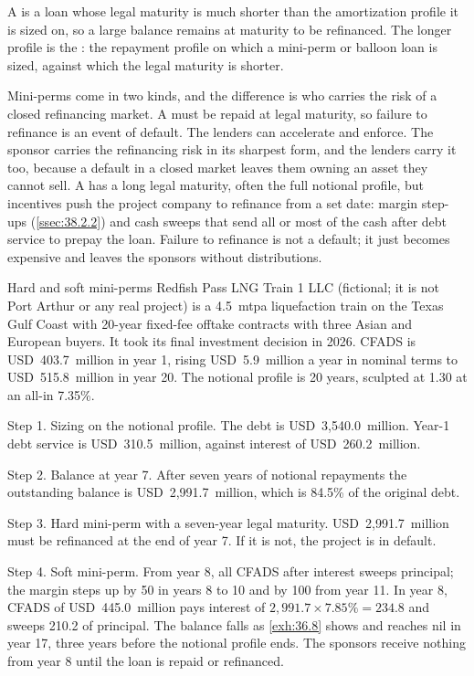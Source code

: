 A  is a loan whose legal maturity is much shorter than the amortization profile it is sized on, so a large balance remains at maturity to be refinanced. The longer profile is the : the repayment profile on which a mini-perm or balloon loan is sized, against which the legal maturity is shorter.

Mini-perms come in two kinds, and the difference is who carries the risk of a closed refinancing market. A  must be repaid at legal maturity, so failure to refinance is an event of default. The lenders can accelerate and enforce. The sponsor carries the refinancing risk in its sharpest form, and the lenders carry it too, because a default in a closed market leaves them owning an asset they cannot sell. A  has a long legal maturity, often the full notional profile, but incentives push the project company to refinance from a set date: margin step-ups (\cref{ssec:38.2.2}) and cash sweeps that send all or most of the cash after debt service to prepay the loan. Failure to refinance is not a default; it just becomes expensive and leaves the sponsors without distributions.

\begin{example}{Hard and soft mini-perms \illustrative}\label{ex:36.10}
Redfish Pass LNG Train 1 LLC (fictional; it is not Port Arthur or any real project) is a 4.5~mtpa liquefaction train on the Texas Gulf Coast with 20-year fixed-fee offtake contracts with three Asian and European buyers. It took its final investment decision in 2026. CFADS is USD~403.7~million in year 1, rising USD~5.9~million a year in nominal terms to USD~515.8~million in year 20. The notional profile is 20 years, sculpted at 1.30\x{} at an all-in 7.35\%.

Step 1. Sizing on the notional profile. The debt is USD~3,540.0~million. Year-1 debt service is USD~310.5~million, against interest of USD~260.2~million.

Step 2. Balance at year 7. After seven years of notional repayments the outstanding balance is USD~2,991.7~million, which is 84.5\% of the original debt.

Step 3. Hard mini-perm with a seven-year legal maturity. USD~2,991.7~million must be refinanced at the end of year 7. If it is not, the project is in default.

Step 4. Soft mini-perm. From year 8, all CFADS after interest sweeps principal; the margin steps up by 50\bps{} in years 8 to 10 and by 100\bps{} from year 11. In year 8, CFADS of USD~445.0~million pays interest of $2{,}991.7 \times 7.85\% = 234.8$ and sweeps 210.2 of principal. The balance falls as \cref{exh:36.8} shows and reaches nil in year 17, three years before the notional profile ends. The sponsors receive nothing from year 8 until the loan is repaid or refinanced.
\end{example}

